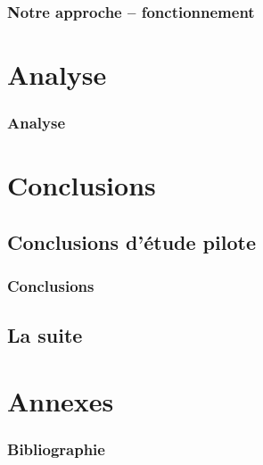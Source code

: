 \documentclass{beamer}
\begin{document}
\begin{frame}
\frametitle{Notre approche -- fonctionnement}
\end{frame}


\section{Analyse}
\begin{frame}
\frametitle{Analyse}
\end{frame}

\section{Conclusions}
\subsection{Conclusions d'étude pilote}
\begin{frame}
\frametitle{Conclusions}
\end{frame}

\subsection{La suite}

\section{Annexes}
\begin{frame}
\frametitle{Bibliographie}
\end{frame}
\end{document}
